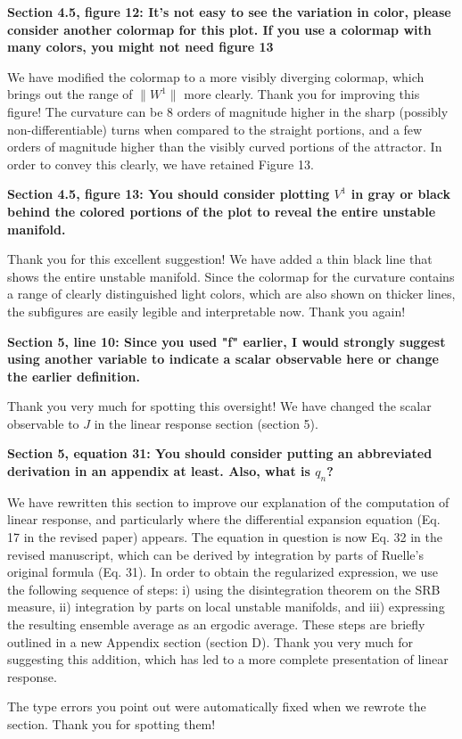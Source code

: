 \documentclass[11pt]{article}
\newcommand{\highlight}[1]{{\color{burgundy}\textbf{#1}}}
\begin{document}
\highlight{Section 4.5, figure 12: It's not easy to see the variation in color, please consider another colormap for this plot. If
you use a colormap with many colors, you might not need figure 13}

We have modified the colormap to a more visibly diverging colormap, which brings out the range of $\|W^1\|$ more clearly. Thank you for improving this figure! The curvature can be 8 orders of magnitude higher in the sharp (possibly non-differentiable) turns when compared to the straight portions, and a few orders of magnitude higher than the visibly curved portions of the attractor. In order to convey this clearly, we have retained Figure 13.

\highlight{Section 4.5, figure 13: You should consider plotting $V^1$ in gray or black behind the colored portions of the plot to
reveal the entire unstable manifold.}

Thank you for this excellent suggestion! We have added a thin black line that shows the entire unstable manifold. Since the colormap for the curvature contains a range of clearly distinguished light colors, which are also shown on thicker lines, the subfigures are easily legible and interpretable now. Thank you again!   


\highlight{Section 5, line 10: Since you used "f" earlier, I would strongly suggest using another variable to indicate a scalar
observable here or change the earlier definition.}

Thank you very much for spotting this oversight! We have changed the scalar observable to $J$ in the linear response section (section 5).

\highlight{Section 5, equation 31: You should consider putting an abbreviated derivation in an appendix at least. Also, what
is $q_n$?}

We have rewritten this section to improve our explanation of the computation of linear response, and particularly where the differential expansion equation (Eq. 17 in the revised paper) appears. The equation in question is now Eq. 32 in the revised manuscript, which can be derived by integration by parts of Ruelle's original formula (Eq. 31). In order to obtain the regularized expression, we use the following sequence of steps: i) using the disintegration theorem on the SRB measure, ii) integration by parts on local unstable manifolds, and iii) expressing the resulting ensemble average as an ergodic average. These steps are briefly outlined in a new Appendix section (section D).
Thank you very much for suggesting this addition, which has led to a more complete presentation of linear response.

The type errors you point out were automatically fixed when we rewrote the section. Thank you for spotting them!
\end{document}
